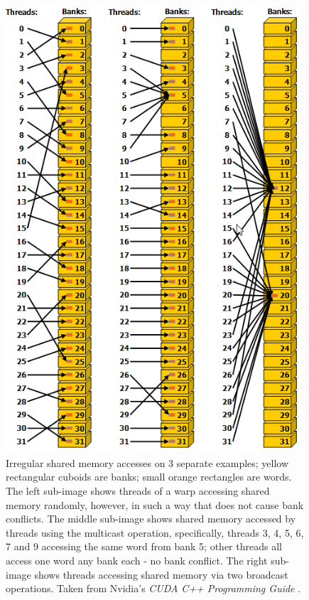 \begin{figure}[ht!]
	\centering
	\includegraphics[width=11cm, keepaspectratio]{images/ch1/CUDA_shared_memory_banks_words_no_conflicts.png}
	\caption{Irregular shared memory accesses on 3 separate examples; yellow rectangular cuboids are banks; small orange rectangles are words. The left sub-image shows threads of a warp accessing shared memory randomly, however, in such a way that does not cause bank conflicts. The middle sub-image shows shared memory accessed by threads using the multicast operation, specifically, threads 3, 4, 5, 6, 7 and 9 accessing the same word from bank 5; other threads all access one word any bank each - no bank conflict. The right sub-image shows threads accessing shared memory via two broadcast operations. Taken from Nvidia's \emph{CUDA C++ Programming Guide} \cite{NVIDIAMay2022}.}
	\label{Figure:theory-CUDA-shared-memory-banks-words-no-conflicts}
\end{figure}

